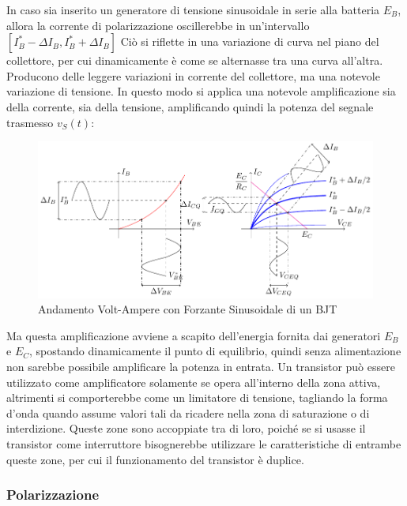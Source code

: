 \documentclass{article}
\numberwithin{equation}{subsection}
\begin{document}
In caso sia inserito un generatore di tensione sinusoidale in serie alla batteria $E_B$, allora la corrente di polarizzazione oscillerebbe in un'intervallo $[I_B^*-\Delta I_B,I_B^*+\Delta I_B]$ 
Ciò si riflette in una variazione di curva nel piano del collettore, per cui dinamicamente è come se alternasse tra una curva all'altra. Producono delle leggere variazioni in corrente 
del collettore, ma una notevole variazione di tensione. In questo modo si applica una notevole amplificazione sia della corrente, sia della 
tensione, amplificando quindi la potenza del segnale trasmesso $v_S(t)$:
\begin{figure}[H]%
    \centering
    \includegraphics{andamento-bjt-circuito-segnale.pdf}%
    \caption{Andamento Volt-Ampere con Forzante Sinusoidale di un BJT}
    \label{fig:andamento-bjt-circuito-segnale}
\end{figure}

Ma questa amplificazione avviene a scapito dell'energia fornita dai generatori $E_B$ e $E_C$, spostando dinamicamente il punto di equilibrio, quindi senza alimentazione non sarebbe 
possibile amplificare la potenza in entrata. 
Un transistor può essere utilizzato come amplificatore solamente se opera all'interno della zona attiva, altrimenti si comporterebbe come un limitatore 
di tensione, tagliando la forma d'onda quando assume valori tali da ricadere nella zona di saturazione o di interdizione. Queste zone sono accoppiate tra di loro, poiché 
se si usasse il transistor come interruttore bisognerebbe utilizzare le caratteristiche di entrambe queste zone, per cui il funzionamento del transistor è duplice. 

\subsubsection{Polarizzazione}
\label{sec:transistor-polarizzazione}
\end{document}
